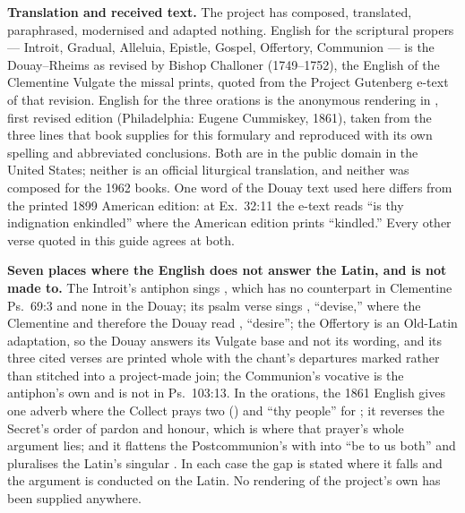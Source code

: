 \textbf{Translation and received text.} The project has composed, translated,
paraphrased, modernised and adapted nothing. English for the scriptural
propers --- Introit, Gradual, Alleluia, Epistle, Gospel, Offertory, Communion
--- is the Douay--Rheims as revised by Bishop Challoner (1749--1752), the
English of the Clementine Vulgate the missal prints, quoted from the Project
Gutenberg e-text of that revision. English for the three orations is the
anonymous rendering in , first revised edition (Philadelphia:
Eugene Cummiskey, 1861), taken from the three lines that book supplies for
this formulary and reproduced with its own spelling and abbreviated
conclusions. Both are in the public domain in the United States; neither is an
official liturgical translation, and neither was composed for the 1962 books.
One word of the Douay text used here differs from the printed 1899 American
edition: at Ex.\ 32:11 the e-text reads ``is thy indignation enkindled'' where
the American edition prints ``kindled.'' Every other verse quoted in this
guide agrees at both.

\textbf{Seven places where the English does not answer the Latin, and is not
made to.} The Introit's antiphon sings , which has no
counterpart in Clementine Ps.\ 69:3 and none in the Douay; its psalm verse
sings , ``devise,'' where the Clementine and
therefore the Douay read , ``desire''; the Offertory is an
Old-Latin adaptation, so the Douay answers its Vulgate base and not its
wording, and its three cited verses are printed whole with the chant's
departures marked rather than stitched into a project-made join; the
Communion's vocative  is the antiphon's own and is not in
Ps.\ 103:13. In the orations, the 1861 English gives one adverb where the
Collect prays two () and ``thy people'' for
; it reverses the Secret's order of pardon and honour,
which is where that prayer's whole argument lies; and it flattens the
Postcommunion's  with  into ``be to us both''
and pluralises the Latin's singular . In each
case the gap is stated where it falls and the argument is conducted on the
Latin. No rendering of the project's own has been supplied anywhere.

